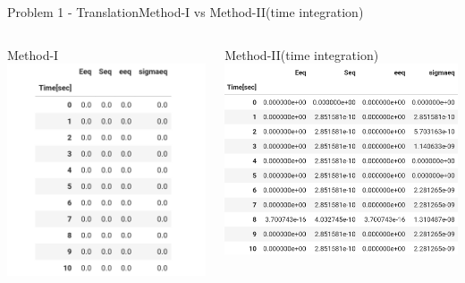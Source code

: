 \documentclass{beamer}
\begin{document}
\begin{frame}{Problem 1 - Translation}{Method-I vs Method-II(time integration)}
    \vspace{-2em}
    \begin{columns}
        \begin{block}{\footnotesize Method-I}
            \includegraphics[width=\textwidth]{Values/m2t1.png}
        \end{block}
        \begin{block}{\footnotesize Method-II(time integration)}
            \includegraphics[width=\textwidth]{Values/m1t1.png}
        \end{block}
    \end{columns}
\end{frame}
\end{document}
